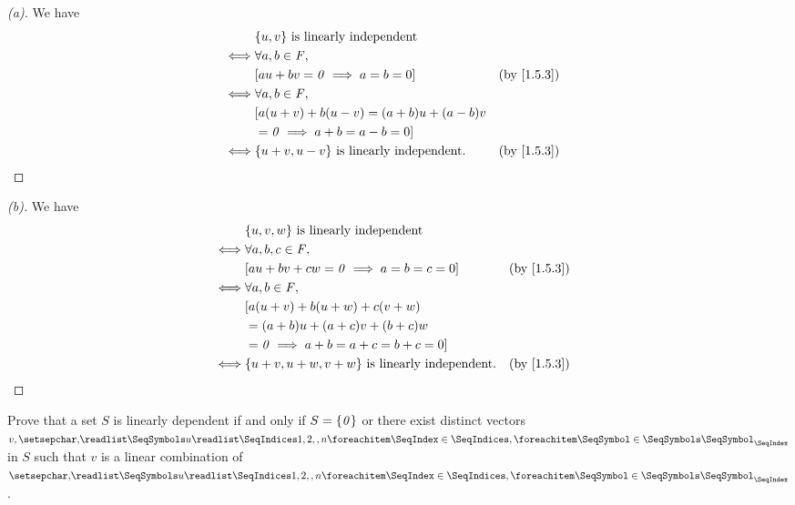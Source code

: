 \begin{proof}[(a)]
  We have
  \begin{align*}
         & \set{u, v} \text{ is linearly independent}                                        \\
    \iff & \forall a, b \in \F,                                                              \\
         & [au + bv = \zv \implies a = b = 0]                  &  & \text{(by \cref{1.5.3})} \\
    \iff & \forall a, b \in \F,                                                              \\
         & [a(u + v) + b(u - v) = (a + b) u + (a - b) v                                      \\
         & = \zv \implies a + b = a - b = 0]                                                 \\
    \iff & \set{u + v, u - v} \text{ is linearly independent}. &  & \text{(by \cref{1.5.3})}
  \end{align*}
\end{proof}

\begin{proof}[(b)]
  We have
  \begin{align*}
         & \set{u, v, w} \text{ is linearly independent}                                            \\
    \iff & \forall a, b, c \in \F,                                                                  \\
         & [au + bv + cw = \zv \implies a = b = c = 0]                &  & \text{(by \cref{1.5.3})} \\
    \iff & \forall a, b \in \F,                                                                     \\
         & [a(u + v) + b(u + w) + c(v + w)                                                          \\
         & = (a + b) u + (a + c) v + (b + c) w                                                      \\
         & = \zv \implies a + b = a + c = b + c = 0]                                                \\
    \iff & \set{u + v, u + w, v + w} \text{ is linearly independent}. &  & \text{(by \cref{1.5.3})}
  \end{align*}
\end{proof}

\begin{ex}\label{ex:1.5.14}
  Prove that a set \(S\) is linearly dependent if and only if \(S = \left\lbrace\mathit{0}\right\rbrace\) or there exist distinct vectors \(v, \seq{u}{1,2,,n}\) in \(S\) such that \(v\) is a linear combination of \(\seq{u}{1,2,,n}\).
\end{ex}

